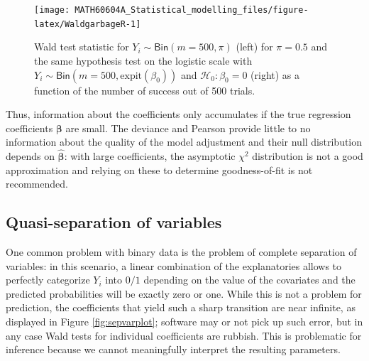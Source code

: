 \documentclass[
  11pt,
  letterpaper,
]{book}
\theoremstyle{definition}
\theoremstyle{definition}
\theoremstyle{definition}
\theoremstyle{remark}
\begin{document}
\begin{figure}

{\centering \texttt{[image: MATH60604A\_Statistical\_modelling\_files/figure-latex/WaldgarbageR-1]} 

}

\caption{Wald test statistic for $Y_i \sim \mathsf{Bin}(m=500, \pi)$ (left)  for $\pi=0.5$ and the same hypothesis test on the logistic scale with $Y_i \sim \mathsf{Bin}(m=500, \mathrm{expit}(\beta_0))$ and $\mathscr{H}_0:\beta_0=0$ (right) as a function of the number of success out of 500 trials.}\label{fig:WaldgarbageR}
\end{figure}

Thus, information about the coefficients only accumulates if the true regression coefficients \(\boldsymbol{\beta}\) are small. The deviance and Pearson provide little to no information about the quality of the model adjustment and their null distribution depends on \(\widehat{\boldsymbol{\beta}}\): with large coefficients, the asymptotic \(\chi^2\) distribution is not a good approximation and relying on these to determine goodness-of-fit is not recommended.

\hypertarget{quasi-separation-of-variables}{%
\subsection{Quasi-separation of variables}\label{quasi-separation-of-variables}}

One common problem with binary data is the problem of complete separation of variables: in this scenario, a linear combination of the explanatories allows to perfectly categorize \(Y_i\) into \(0/1\) depending on the value of the covariates and the predicted probabilities will be exactly zero or one. While this is not a problem for prediction, the coefficients that yield such a sharp transition are near infinite, as displayed in Figure \ref{fig:sepvarplot}; software may or not pick up such error, but in any case Wald tests for individual coefficients are rubbish. This is problematic for inference because we cannot meaningfully interpret the resulting parameters.
\end{document}
